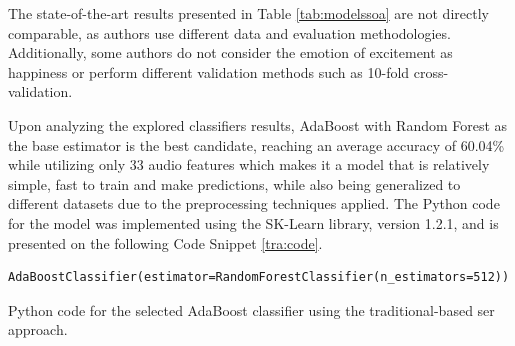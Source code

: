 The state-of-the-art results presented in Table \ref{tab:modelssoa} are not directly comparable, as authors use different data and evaluation methodologies. Additionally, some authors do not consider the emotion of excitement as happiness or perform different validation methods such as 10-fold cross-validation.

Upon analyzing the explored classifiers results, AdaBoost with Random Forest as the base estimator is the best candidate, reaching an average accuracy of 60.04\% while utilizing only 33 audio features which makes it a model that is relatively simple, fast to train and make predictions, while also being generalized to different datasets due to the preprocessing techniques applied. The Python code for the model was implemented using the SK-Learn library, version 1.2.1, and is presented on the following  Code Snippet \ref{tra:code}.

\begin{listing}[H]
	\begin{verbatim}
AdaBoostClassifier(estimator=RandomForestClassifier(n_estimators=512))
	\end{verbatim}
	\caption{Python code for the selected AdaBoost classifier using the traditional-based \ac{ser} approach.}
	\label{tra:code}
\end{listing}